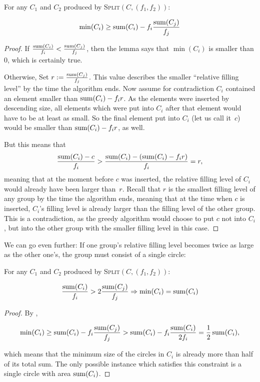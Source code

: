 \documentclass[a4paper,style=print,bibliography=totoc,nexus,lnum,extramargin]{tubsbook}
\begin{document}
\begin{lemma}\label{th:min1}
    For any $C_1$ and $C_2$ produced by \textsc{Split}$(C,(f_1,f_2))$:

    $$\min(C_i) \ge \operatorname{sum}(C_i) - f_i\frac{\operatorname{sum}(C_j)}{f_j}$$
\end{lemma}

\begin{proof}
    If $\frac{\operatorname{sum}(C_i)}{f_i} < \frac{\operatorname{sum}(C_j)}{f_j}$, then the lemma says that $\min(C_i)$ is smaller than 0, which is certainly true.

    Otherwise, Set $r := \frac{\operatorname{sum}(C_j)}{f_j}$. This value describes the smaller “relative filling level” by the time the algorithm ends.
    Now assume for contradiction $C_i$ contained an element smaller than $\operatorname{sum}(C_i) - f_i r$. As the elements were inserted by descending size, all elements which were put into $C_i$ after that element would have to be at least as small. So the final element put into $C_i$ (let us call it~$c$) would be smaller than $\operatorname{sum}(C_i) - f_i r$, as well.

    But this means that $$\frac{\operatorname{sum}(C_i) - c}{f_i} > \frac{\operatorname{sum}(C_i) - (\operatorname{sum}(C_i) - f_i r)}{f_i} = r,$$ meaning that at the moment before $c$ was inserted, the relative filling level of $C_i$ would already have been larger than~$r$.
    Recall that $r$ is the smallest filling level of any group by the time the algorithm ends, meaning that at the time when $c$ is inserted, $C_i$'s filling level is already larger than the filling level of the other group.
    This is a contradiction, as the greedy algorithm would choose to put $c$ not into $C_i$, but into the other group with the smaller filling level in this case.
\end{proof}

We can go even further: If one group's relative filling level becomes twice as large as the other one's, the group must consist of a single circle:

\begin{lemma}\label{th:min2}
    For any $C_1$ and $C_2$ produced by \textsc{Split}$(C,(f_1,f_2))$:

    $$\frac{\operatorname{sum}(C_i)}{f_i} > 2\frac{\operatorname{sum}(C_j)}{f_j} \Rightarrow \min(C_i) = \operatorname{sum}(C_i)$$
\end{lemma}

\begin{proof}
    By ,

    $$\min(C_i) \ge \operatorname{sum}(C_i) - f_i\frac{\operatorname{sum}(C_j)}{f_j} > \operatorname{sum}(C_i) - f_i\frac{\operatorname{sum}(C_i)}{2f_i} = \frac{1}{2}\operatorname{sum}(C_i),$$

    which means that the minimum size of the circles in $C_i$ is already more than half of its total sum. The only possible instance which satisfies this constraint is a single circle with area $\operatorname{sum}(C_i)$.

\end{proof}
\end{document}
